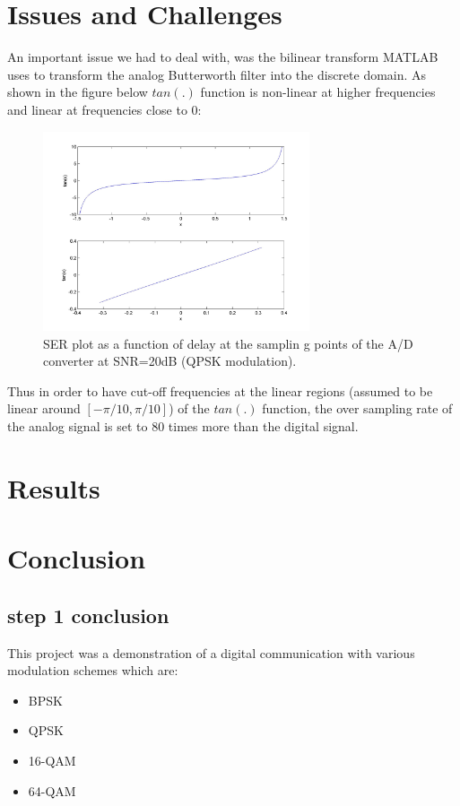 \documentclass[]{article}
\begin{document}
\newpage
\section{Issues and Challenges}
\label{sec:issues}
An important issue we had to deal with, was the bilinear transform MATLAB uses to transform the analog Butterworth filter into the discrete domain. As shown in the figure below $tan(.)$ function is non-linear at higher frequencies and linear at frequencies close to 0:

\begin{figure}[H]
\centering
\hspace*{-2cm}\includegraphics[width=0.7\textwidth]{tan_graph.jpg}
\caption{SER plot as a function of delay at the samplin g points of the A/D converter at SNR=20dB (QPSK modulation). \label{fig:delay}}
\end{figure} 

Thus in order to have cut-off frequencies at the linear regions (assumed to be linear around $\left[ -\pi/10,\pi/10 \right] $) of the $tan(.)$ function, the over sampling rate of the analog signal is set to 80 times more than the digital signal. \\


\newpage
\section{Results}
\label{sec:results}



\newpage
\section{Conclusion}
\subsection{step 1 conclusion}
This project was a demonstration of a digital communication with various modulation schemes which are:
\begin{itemize}
\item BPSK
\item QPSK
\item 16-QAM
\item 64-QAM
\end{itemize}
\end{document}

